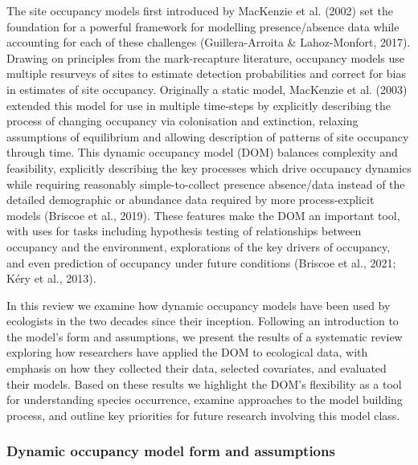 \documentclass[
]{article}
\begin{document}
The site occupancy models first introduced by MacKenzie et al. (2002)
set the foundation for a powerful framework for modelling
presence/absence data while accounting for each of these challenges
(Guillera-Arroita \& Lahoz-Monfort, 2017). Drawing on principles from
the mark-recapture literature, occupancy models use multiple resurveys
of sites to estimate detection probabilities and correct for bias in
estimates of site occupancy. Originally a static model, MacKenzie et al.
(2003) extended this model for use in multiple time-steps by explicitly
describing the process of changing occupancy via colonisation and
extinction, relaxing assumptions of equilibrium and allowing description
of patterns of site occupancy through time. This dynamic occupancy model
(DOM) balances complexity and feasibility, explicitly describing the key
processes which drive occupancy dynamics while requiring reasonably
simple-to-collect presence absence/data instead of the detailed
demographic or abundance data required by more process-explicit models
(Briscoe et al., 2019). These features make the DOM an important tool,
with uses for tasks including hypothesis testing of relationships
between occupancy and the environment, explorations of the key drivers
of occupancy, and even prediction of occupancy under future conditions
(Briscoe et al., 2021; Kéry et al., 2013).

In this review we examine how dynamic occupancy models have been used by
ecologists in the two decades since their inception. Following an
introduction to the model's form and assumptions, we present the results
of a systematic review exploring how researchers have applied the DOM to
ecological data, with emphasis on how they collected their data,
selected covariates, and evaluated their models. Based on these results
we highlight the DOM's flexibility as a tool for understanding species
occurrence, examine approaches to the model building process, and
outline key priorities for future research involving this model class.

\subsubsection{Dynamic occupancy model form and
assumptions}\label{dynamic-occupancy-model-form-and-assumptions}
\end{document}
